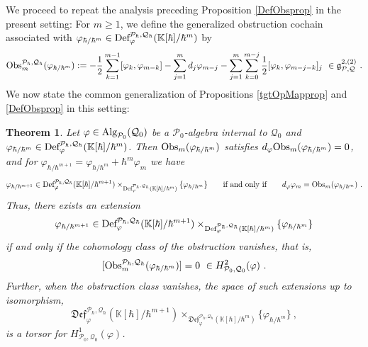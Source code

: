 \documentclass[11pt]{amsart}
\numberwithin{equation}{section}
\newtheorem{theo}{Theorem}[section]
\theoremstyle{definition}
\newcommand{\bb}{\mathbb}
\newcommand{\mc}{\mathcal}
\newcommand{\mf}{\mathfrak}
\newcommand{\Def}{{\textup{Def}}}
\newcommand{\fDef}{{\mathfrak{Def}}}
\newcommand{\Ph}{{\mathcal{P}_\hbar}}
\newcommand{\Qh}{{\mathcal{Q}_\hbar}}
\newcommand{\K}{{\bb K}}
\newcommand{\Obs}{{\textup{Obs}}}
\newcommand{\Alg}{{\textup{Alg}}}
\newcommand{\0}{{\textbf{0}}}
\newcommand{\g}{{\mf{g}}}
\def \mf{\mathfrak}
\begin{document}

We proceed to repeat the analysis preceding Proposition \ref{DefObsprop} in the present setting: For $m\geq 1$, we define the generalized obstruction cochain associated with $\varphi_{\hbar/\hbar^{m}}\in \Def^{\Ph,\Qh}_\varphi(\K[\hbar]/\hbar^{m}) $ by
\begin{equation}\label{Obshbareqn}
	 \Obs_m^{\Ph,\Qh}(\varphi_{\hbar/\hbar^{m}}):=-\frac{1}{2} \sum_{k=1}^{m-1}[ \varphi_k,\varphi_{m-k} ] -  \sum_{j=1}^m d_j \varphi_{m-j} - \sum_{j=1}^m \sum_{k=0}^{m-j} \frac{1}{2}[\varphi_k, \varphi_{m-j-k}]_j  \ \in \g^{2,(2)}_{\mc P,\mc Q} \ .
\end{equation}
We now state the common generalization of Propositions \ref{tgtOpMapprop} and \ref{DefObsprop} in this setting:

\begin{theo}\label{DefObsThm} Let $\varphi\in \Alg_{\mc P_0}(\mc Q_0)$ be a $\mc P_0$-algebra internal to $\mc Q_0$ and $\varphi_{\hbar/\hbar^{m}}\in \Def^{\Ph,\Qh}_\varphi(\K[\hbar]/\hbar^{m}) $. Then $\Obs_m(\varphi_{\hbar/\hbar^{m}})$ satisfies $d_\varphi \Obs_m(\varphi_{\hbar/\hbar^{m}})=0$, and for  $\varphi_{ \hbar/ \hbar^{m+1}} =  \varphi_{\hbar/\hbar^{m}} + \hbar^m \varphi_m $ we have
		\[ \varphi_{ \hbar/ \hbar^{m+1}} \in \Def^{\Ph,\Qh}_\varphi(\K[\hbar]/\hbar^{m+1}) \times_{\Def^{\Ph,\Qh}_\varphi(\K[\hbar]/\hbar^{m}) } \{\varphi_{\hbar/\hbar^{m}} \} \qquad \text{if and only if} \qquad d_{\varphi} \varphi_m  = \Obs_m(\varphi_{\hbar/\hbar^{m}}) \ . \]
		Thus, there exists an extension
\[  \varphi_{ \hbar/ \hbar^{m+1}} \in \Def^{\Ph,\Qh}_\varphi(\K[\hbar]/\hbar^{m+1}) \times_{\Def^{\Ph,\Qh}_\varphi(\K[\hbar]/\hbar^{m}) } \{\varphi_{\hbar/\hbar^{m}} \} \]
if and only if the cohomology class of the obstruction vanishes, that is,
\[ [ \Obs^{\Ph,\Qh}_m(\varphi_{\hbar/\hbar^{m}})]= 0 \ \in H^{2}_{\mc P_0,\mc Q_0}(\varphi) \ .\]
Further, when the obstruction class vanishes, the space of such extensions up to isomorphism,
\[  \fDef^{\Ph,\Qh}_\varphi(\K[\hbar]/\hbar^{m+1}) \times_{\fDef^{\Ph,\Qh}_\varphi(\K[\hbar]/\hbar^{m}) } \{\varphi_{\hbar/\hbar^{m}} \} \ , \]
is a torsor for $H^{1}_{\mc P_0,\mc Q_0}(\varphi)$.
\end{theo}
\end{document}
